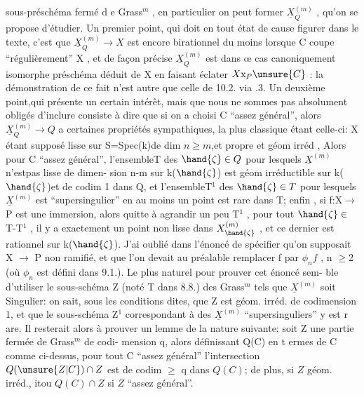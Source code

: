 
sous-préschéma fermé d e Grass$^{m}$ , en particulier on peut former $\underline{X}^{(m)}_{Q}$ ,
qu'on se propose d'étudier. Un premier point, qui doit en tout état de
cause figurer dans le texte, c'est que $\underline{X}^{(m)}_{Q} \longrightarrow X$ est encore birationnel
du moins lorsque C coupe ``régulièrement'' X , et de façon précise $\underline{X}^{(m)}_{Q}$
est dans œ cas canoniquement isomorphe  préschéma déduit de X en
faisant éclater $X\mathrm{x}_{P}\unsure{C}$ : la démonstration de ce fait n'est autre que celle
de 10.2. via .3. Un deuxième point,qui présente un certain intérêt,
mais que nous ne sommes pas absolument obligés d'inclure consiste à
dire que si on a choisi C ``assez général'', alors $\underline{X}^{(m)}_{Q} \longrightarrow Q$ a certaines
propriétés sympathiques, la plus classique étant celle-ci: X étant
supposé lisse sur S=Spec(k)de dim $n \geq m$,et propre et géom irréd , Alors pour C ``assez
général'', l'ensembleT des $\hand{\zeta}\in Q$ pour lesquels $\underline{X}^{(m)}$ n'estpas lisse de dimen-%
sion n-m sur k($\hand{\zeta}$) est géom irréductible sur k($\hand{\zeta}$)et de codim 1 dans Q, et 
l'ensembleT$^{1}$ des $\hand{\zeta}\in T$ pour lesquels $\underline{X}^{(m)}$ est ``supersingulier'' en au
moins un point est rare dans T;
 enfin , si f:X$\rightarrow$P est une immersion, alors
quitte à agrandir un peu T$^{1}$ , pour tout $\hand{\zeta}\in$ T-T$^{1}$ , il y a exactement un
\placedmargin{$|$}point non lisse dans $X^{(m)}_{\hand{\zeta}}$ , et ce dernier est rationnel sur k($\hand{\zeta}$). J'ai
oublié dans l'énoncé de spécifier qu'on supposait X  $\longrightarrow$ P non ramifié,
et que l'on devait au préalable remplacer f par $\phi_{n}f$ , n $\geq$2 (où $\phi_{n}$ est
défini dans 9.1.). Le plus naturel  pour prouver cet énoncé sem-%
ble d'utiliser le sous-schéma Z (noté T dans 8.8.) des Grass$^{m}$ tels
que $\underline{X}^{(m)}$ soit Singulier: on sait, sous les conditions dites, que Z
est géom. irréd. de codimension 1, et que le sous-schéma Z$^{1}$ correspondant
à des $\underline{X}^{(m)}$ ``supersinguliers'' y est r are. Il resterait alors à prouver un
lemme de la nature suivante: soit Z une partie fermée de Grass$^{m}$ de codi-%
mension q, alors définissant Q(C) en t ermes de C comme ci-dessus, pour
tout C ``assez général'' l'intersection $Q(\unsure{Z|C})\cap Z$ est de codim $\geq$ q dans
$Q(C)$; de plus, si $Z$ géom. irréd., itou $Q(C)\cap Z$ si $Z$ ``assez général''.

